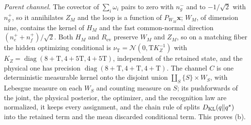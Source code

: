 \emph{Parent channel.} The covector of \(\sum_i\omega_i\) pairs to zero with
\(n^-_g\) and to \(-1/\sqrt2\) with \(n^+_g\), so it annihilates \(Z_M\) and the
loop is a function of \(P_{W_M}\mathbf x\); \(W_M\), of dimension nine, contains
the kernel of \(H_M\) and the fast common-normal direction
\((n^+_e+n^+_f)/\sqrt2\). Both \(H_M\) and \(R_{\mathrm{ev}}\) preserve \(W_M\)
and \(Z_M\), so on a matching fiber the hidden optimizing conditional is
\(\nu_{\mathrm T}=\mathcal N(0,\mathrm TK_Z^{-1})\) with
\(K_Z=\operatorname{diag}(8+\mathrm T,4+5\mathrm T,4+5\mathrm T)\), independent of
the retained state, and the physical one has precision
\(\operatorname{diag}(8+\mathrm T,4+\mathrm T,4+\mathrm T)\). The channel \(C\)
is one deterministic measurable kernel onto the disjoint union
\(\coprod_S\{S\}\times W_S\), with Lebesgue measure on each \(W_S\) and counting
measure on \(S\); its pushforwards of the joint, the physical posterior, the
optimizer, and the recognition law are normalized, it keeps every assignment,
and the chain rule of  splits
\(D_{\mathrm{KL}}(q\Vert q^\star)\) into the retained term and the mean discarded
conditional term. This proves (b).

